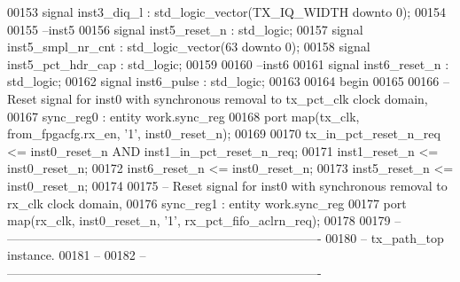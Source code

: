 \begin{DoxyCode}
00153 \textcolor{keywordflow}{signal} \textcolor{vhdlchar}{inst3_diq_l}               \textcolor{vhdlchar}{:} \textcolor{comment}{std\_logic\_vector}\textcolor{vhdlchar}{(}\textcolor{vhdlchar}{TX_IQ_WIDTH} \textcolor{keywordflow}{downto} \textcolor{vhdllogic}{}\textcolor{vhdllogic}{0}\textcolor{vhdlchar}{)};
00154 
00155 \textcolor{keyword}{--inst5}
00156 \textcolor{keywordflow}{signal} \textcolor{vhdlchar}{inst5_reset_n}             \textcolor{vhdlchar}{:} \textcolor{comment}{std\_logic};
00157 \textcolor{keywordflow}{signal} \textcolor{vhdlchar}{inst5_smpl_nr_cnt}         \textcolor{vhdlchar}{:} \textcolor{comment}{std\_logic\_vector}\textcolor{vhdlchar}{(}\textcolor{vhdllogic}{}\textcolor{vhdllogic}{63} \textcolor{keywordflow}{downto} \textcolor{vhdllogic}{}\textcolor{vhdllogic}{0}\textcolor{vhdlchar}{)};
00158 \textcolor{keywordflow}{signal} \textcolor{vhdlchar}{inst5_pct_hdr_cap}         \textcolor{vhdlchar}{:} \textcolor{comment}{std\_logic};
00159 
00160 \textcolor{keyword}{--inst6}
00161 \textcolor{keywordflow}{signal} \textcolor{vhdlchar}{inst6_reset_n}             \textcolor{vhdlchar}{:} \textcolor{comment}{std\_logic};
00162 \textcolor{keywordflow}{signal} \textcolor{vhdlchar}{inst6_pulse}               \textcolor{vhdlchar}{:} \textcolor{comment}{std\_logic};
00163 
00164 \textcolor{vhdlkeyword}{begin}
00165    
00166 \textcolor{keyword}{   -- Reset signal for inst0 with synchronous removal to tx\_pct\_clk clock domain, }
00167    sync\_reg0 : \textcolor{keywordflow}{entity} work.sync_reg 
00168    \textcolor{keywordflow}{port} \textcolor{keywordflow}{map}(tx_clk, from_fpgacfg.rx_en, '1', inst0_reset_n\textcolor{vhdlchar}{)};
00169    
00170    \textcolor{vhdlchar}{tx_in_pct_reset_n_req}   \textcolor{vhdlchar}{<=} \textcolor{vhdlchar}{inst0_reset_n} \textcolor{keywordflow}{AND} \textcolor{vhdlchar}{inst1_in_pct_reset_n_req};   
00171    inst1\_reset\_n           <= inst0\_reset\_n;
00172    inst6\_reset\_n           <= inst0\_reset\_n;  
00173    inst5\_reset\_n           <= inst0\_reset\_n;
00174    
00175 \textcolor{keyword}{   -- Reset signal for inst0 with synchronous removal to rx\_clk clock domain, }
00176    sync\_reg1 : \textcolor{keywordflow}{entity} work.sync_reg 
00177    \textcolor{keywordflow}{port} \textcolor{keywordflow}{map}(rx_clk, inst0_reset_n, '1', rx_pct_fifo_aclrn_req\textcolor{vhdlchar}{)};
00178      
00179 \textcolor{keyword}{-- ----------------------------------------------------------------------------}
00180 \textcolor{keyword}{-- tx\_path\_top instance.}
00181 \textcolor{keyword}{-- }
00182 \textcolor{keyword}{-- ----------------------------------------------------------------------------}

\end{DoxyCode}
